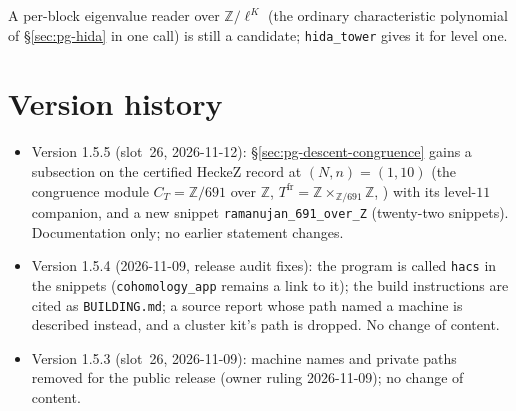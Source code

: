 \documentclass[11pt]{article}
\newcommand{\Z}{\mathbb{Z}}
\newcommand{\code}[1]{\texttt{#1}}
\newcommand{\file}[1]{\texttt{#1}}
\begin{document}
A per-block eigenvalue reader over $\Z/\ell^{K}$ (the ordinary characteristic polynomial of \S\ref{sec:pg-hida} in one call) is still a candidate; \code{hida\_tower} gives it
for level one.

\section{Version history}\label{app:pg-history}

\begin{itemize}[leftmargin=1.6em,itemsep=2pt]
\item Version 1.5.5 (slot~26, 2026-11-12): \S\ref{sec:pg-descent-congruence} gains a subsection on the certified HeckeZ record at $(N,n)=(1,10)$ (the congruence module $C_T=\Z/691$ over $\Z$, $T^{\mathrm{fr}}=\Z\times_{\Z/691}\Z$, {}) with its level-$11$ companion, and a new snippet \file{ramanujan\_691\_over\_Z} (twenty-two snippets). Documentation only; no earlier statement changes.
\item Version 1.5.4 (2026-11-09, release audit fixes): the program is called \file{hacs} in the snippets (\file{cohomology\_app} remains a link to it); the build instructions are cited as \file{BUILDING.md}; a source report whose path named a machine is described instead, and a cluster kit's path is dropped. No change of content.
\item Version 1.5.3 (slot~26, 2026-11-09): machine names and private paths removed for the public release (owner ruling 2026-11-09); no change of content.

\end{itemize}
\end{document}
